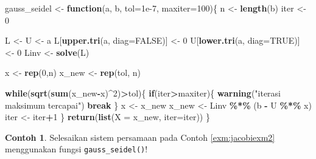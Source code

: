 \documentclass[
]{book}
\newenvironment{Shaded}{\begin{snugshade}}{\end{snugshade}}
\newcommand{\AttributeTok}[1]{\textcolor[rgb]{0.13,0.29,0.53}{#1}}
\newcommand{\ConstantTok}[1]{\textcolor[rgb]{0.56,0.35,0.01}{#1}}
\newcommand{\ControlFlowTok}[1]{\textcolor[rgb]{0.13,0.29,0.53}{\textbf{#1}}}
\newcommand{\DecValTok}[1]{\textcolor[rgb]{0.00,0.00,0.81}{#1}}
\newcommand{\FloatTok}[1]{\textcolor[rgb]{0.00,0.00,0.81}{#1}}
\newcommand{\FunctionTok}[1]{\textcolor[rgb]{0.13,0.29,0.53}{\textbf{#1}}}
\newcommand{\NormalTok}[1]{#1}
\newcommand{\OtherTok}[1]{\textcolor[rgb]{0.56,0.35,0.01}{#1}}
\newcommand{\SpecialCharTok}[1]{\textcolor[rgb]{0.81,0.36,0.00}{\textbf{#1}}}
\newcommand{\StringTok}[1]{\textcolor[rgb]{0.31,0.60,0.02}{#1}}
\theoremstyle{definition}
\theoremstyle{definition}
\newtheorem{example}{Contoh}[chapter]
\theoremstyle{definition}
\theoremstyle{definition}
\theoremstyle{remark}
\begin{document}
\begin{Shaded}
\begin{Highlighting}[]
\NormalTok{gauss\_seidel }\OtherTok{\textless{}{-}} \ControlFlowTok{function}\NormalTok{(a, b, }\AttributeTok{tol=}\FloatTok{1e{-}7}\NormalTok{, }\AttributeTok{maxiter=}\DecValTok{100}\NormalTok{)\{}
\NormalTok{  n }\OtherTok{\textless{}{-}} \FunctionTok{length}\NormalTok{(b)}
\NormalTok{  iter }\OtherTok{\textless{}{-}} \DecValTok{0}
  
  
\NormalTok{  L }\OtherTok{\textless{}{-}}\NormalTok{ U }\OtherTok{\textless{}{-}}\NormalTok{ a}
\NormalTok{  L[}\FunctionTok{upper.tri}\NormalTok{(a, }\AttributeTok{diag=}\ConstantTok{FALSE}\NormalTok{)] }\OtherTok{\textless{}{-}} \DecValTok{0}
\NormalTok{  U[}\FunctionTok{lower.tri}\NormalTok{(a, }\AttributeTok{diag=}\ConstantTok{TRUE}\NormalTok{)] }\OtherTok{\textless{}{-}} \DecValTok{0}
\NormalTok{  Linv }\OtherTok{\textless{}{-}} \FunctionTok{solve}\NormalTok{(L)}
  
\NormalTok{  x }\OtherTok{\textless{}{-}} \FunctionTok{rep}\NormalTok{(}\DecValTok{0}\NormalTok{,n)}
\NormalTok{  x\_new }\OtherTok{\textless{}{-}} \FunctionTok{rep}\NormalTok{(tol, n)}
  
  \ControlFlowTok{while}\NormalTok{(}\FunctionTok{sqrt}\NormalTok{(}\FunctionTok{sum}\NormalTok{(x\_new}\SpecialCharTok{{-}}\NormalTok{x)}\SpecialCharTok{\^{}}\DecValTok{2}\NormalTok{)}\SpecialCharTok{\textgreater{}}\NormalTok{tol)\{}
            \ControlFlowTok{if}\NormalTok{(iter}\SpecialCharTok{\textgreater{}}\NormalTok{maxiter)\{}
              \FunctionTok{warning}\NormalTok{(}\StringTok{"iterasi maksimum tercapai"}\NormalTok{)}
              \ControlFlowTok{break}
\NormalTok{            \}}
\NormalTok{            x }\OtherTok{\textless{}{-}}\NormalTok{ x\_new}
\NormalTok{            x\_new }\OtherTok{\textless{}{-}}\NormalTok{ Linv }\SpecialCharTok{\%*\%}\NormalTok{ (b }\SpecialCharTok{{-}}\NormalTok{ U }\SpecialCharTok{\%*\%}\NormalTok{ x)}
\NormalTok{            iter }\OtherTok{\textless{}{-}}\NormalTok{ iter}\SpecialCharTok{+}\DecValTok{1}
\NormalTok{  \}}
      \FunctionTok{return}\NormalTok{(}\FunctionTok{list}\NormalTok{(}\AttributeTok{X =}\NormalTok{ x\_new, }\AttributeTok{iter=}\NormalTok{iter))}
\NormalTok{\}}
\end{Highlighting}
\end{Shaded}

\begin{example}
\protect\hypertarget{exm:gaussseidelexm2}{}\label{exm:gaussseidelexm2}Selesaikan sistem persamaan pada Contoh \ref{exm:jacobiexm2} menggunakan fungsi \texttt{gauss\_seidel()}!
\end{example}
\end{document}
